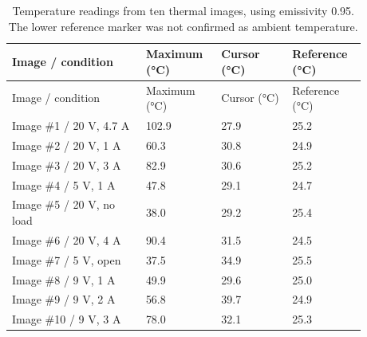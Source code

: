 \begingroup
\scriptsize
\setlength{\tabcolsep}{3pt}
\renewcommand{\arraystretch}{1.12}
\begin{longtable}{@{}L{0.3400\linewidth} L{0.1800\linewidth} L{0.1800\linewidth} L{0.1800\linewidth}@{}}
\caption{Temperature readings from ten thermal images, using emissivity 0.95. The lower reference marker was not confirmed as ambient temperature.}\label{tab:thermal-results}\\
\toprule
Image / condition & Maximum (°C) & Cursor (°C) & Reference (°C)\\
\midrule
\endfirsthead
\toprule
Image / condition & Maximum (°C) & Cursor (°C) & Reference (°C)\\
\midrule
\endhead
Image \#1 / 20 V, 4.7 A & 102.9 & 27.9 & 25.2\\
Image \#2 / 20 V, 1 A & 60.3 & 30.8 & 24.9\\
Image \#3 / 20 V, 3 A & 82.9 & 30.6 & 25.2\\
Image \#4 / 5 V, 1 A & 47.8 & 29.1 & 24.7\\
Image \#5 / 20 V, no load & 38.0 & 29.2 & 25.4\\
Image \#6 / 20 V, 4 A & 90.4 & 31.5 & 24.5\\
Image \#7 / 5 V, open & 37.5 & 34.9 & 25.5\\
Image \#8 / 9 V, 1 A & 49.9 & 29.6 & 25.0\\
Image \#9 / 9 V, 2 A & 56.8 & 39.7 & 24.9\\
Image \#10 / 9 V, 3 A & 78.0 & 32.1 & 25.3\\
\bottomrule
\end{longtable}
\endgroup
